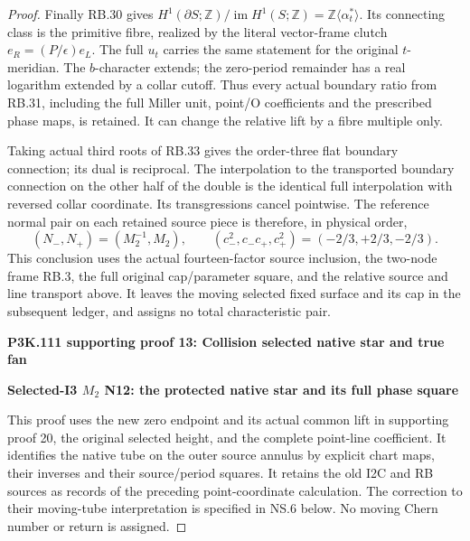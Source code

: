 \begin{proof}
Finally RB.30 gives
\(H^1(\partial S;\mathbb Z)/\operatorname{im}H^1(S;\mathbb Z)
=\mathbb Z\langle\alpha_t^*\rangle\). Its connecting class
is the primitive fibre, realized by the literal vector-frame
clutch \(e_R=(P/\epsilon)e_L\). The full \(u_t\) carries
the same statement for the original \(t\)-meridian. The
\(b\)-character extends; the zero-period remainder has a
real logarithm extended by a collar cutoff. Thus every actual
boundary ratio from RB.31, including the full Miller unit,
point/O coefficients and the prescribed phase maps, is retained.
It can change the relative lift by a fibre multiple only.

Taking actual third roots of RB.33 gives the order-three flat
boundary connection; its dual is reciprocal. The interpolation
to the transported boundary connection on the other half of
the double is the identical full interpolation with reversed
collar coordinate. Its transgressions cancel pointwise.
The reference normal pair on each retained source piece is
therefore, in physical order,
\[
 (N_-,N_+)=(M_2^{-1},M_2),\qquad
 (c_-^2,c_-c_+,c_+^2)=(-2/3,+2/3,-2/3).
 \tag{RB.34}
\]
This conclusion uses the actual fourteen-factor source inclusion,
the two-node frame RB.3, the full original cap/parameter square,
and the relative source and line transport above. It leaves the
moving selected fixed surface and its cap in the subsequent
ledger, and assigns no total characteristic pair.




\par\bigskip\noindent\textbf{P3K.111 supporting proof 13: Collision selected native star and true fan}\par\nobreak
\par

\medskip\noindent\textbf{Selected-I3 \(M_{2}\) N12: the protected native star and its full phase square}

\par\nobreak

This proof uses the new zero endpoint and its actual common lift in supporting proof 20,
the original selected height, and the complete point-line coefficient.
It identifies the native tube on the outer source annulus by explicit
chart maps, their inverses and their source/period squares. It retains
the old I2C and RB sources as records of the preceding point-coordinate
calculation. The correction to their moving-tube interpretation is
specified in NS.6 below. No moving Chern number or return is assigned.


\end{proof}

